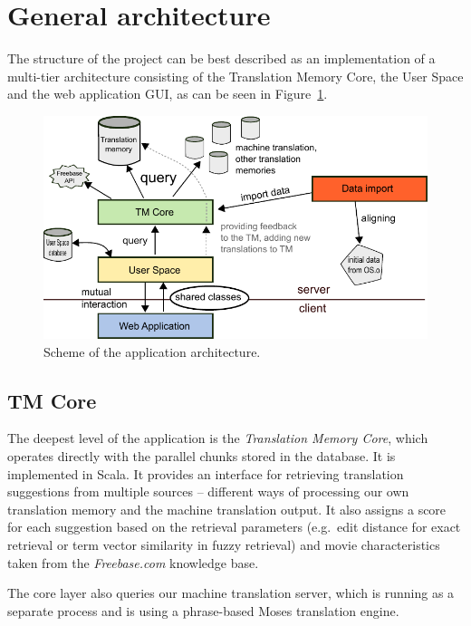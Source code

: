 \section{General architecture}
The structure of the project can be best described as an implementation of a multi-tier architecture consisting of the Translation Memory Core, the User Space and the web application GUI, as can be seen in Figure~\ref{projectStructure:layers}.

\begin{figure}[h]
\begin{center}
\includegraphics{figures/scheme.pdf}
\end{center}
\caption{Scheme of the application architecture.}\label{projectStructure:layers}
\end{figure}

\subsection*{TM Core}
The deepest level of the application is the \emph{Translation Memory Core}, which operates directly with the parallel chunks stored in the database. It is implemented in Scala. It provides an interface for retrieving translation suggestions from multiple sources -- different ways of processing our own translation memory and the machine translation output. It also assigns a score for each suggestion based on the retrieval parameters (e.g.\ edit distance for exact retrieval or term vector similarity in fuzzy retrieval) and movie characteristics taken from the \emph{Freebase.com} knowledge base.

The core layer also queries our machine translation server, which is running as a separate process and is using a phrase-based Moses translation engine.


